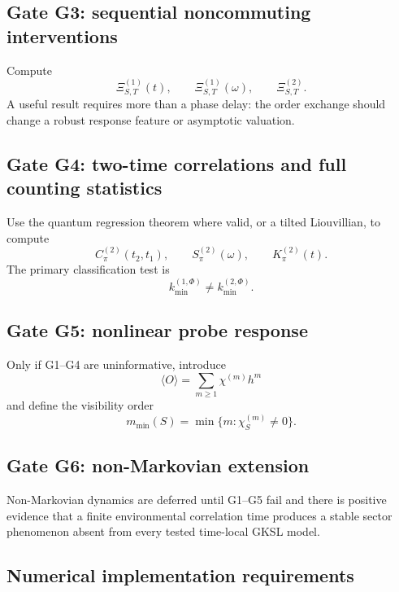 \documentclass[11pt]{article}
\theoremstyle{definition}
\theoremstyle{remark}
\newcommand{\PhiF}{\Phi}
\newcommand{\XiI}{\Xi}
\begin{document}
\subsection{Gate G3: sequential noncommuting interventions}

Compute
\begin{equation}
\XiI_{S,T}^{(1)}(t),
\qquad
\XiI_{S,T}^{(1)}(\omega),
\qquad
\XiI_{S,T}^{(2)}.
\end{equation}
A useful result requires more than a phase delay: the order exchange should change a robust response feature or asymptotic valuation.

\subsection{Gate G4: two-time correlations and full counting statistics}

Use the quantum regression theorem where valid, or a tilted Liouvillian, to compute
\begin{equation}
C_{\pi}^{(2)}(t_2,t_1),
\qquad
S_{\pi}^{(2)}(\omega),
\qquad
K_{\pi}^{(2)}(t).
\end{equation}
The primary classification test is
\begin{equation}
k_{\min}^{(1,\PhiF)}\neq k_{\min}^{(2,\PhiF)}.
\end{equation}

\subsection{Gate G5: nonlinear probe response}

Only if G1--G4 are uninformative, introduce
\begin{equation}
\langle O\rangle=\sum_{m\ge1}\chi^{(m)}h^m
\end{equation}
and define the visibility order
\begin{equation}
m_{\min}(S)=\min\{m:\chi_S^{(m)}\neq0\}.
\end{equation}

\subsection{Gate G6: non-Markovian extension}

Non-Markovian dynamics are deferred until G1--G5 fail and there is positive evidence that a finite environmental correlation time produces a stable sector phenomenon absent from every tested time-local GKSL model.

\subsection{Numerical implementation requirements}
\end{document}
